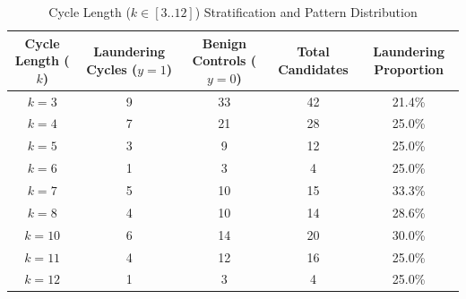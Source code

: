 \begin{table}[htbp]
\centering
\caption{Cycle Length ($k \in [3..12]$) Stratification and Pattern Distribution}
\label{tab:cycle_ablation}
\begin{tabular}{ccccc}
\hline
\textbf{Cycle Length ($k$)} & \textbf{Laundering Cycles ($y=1$)} & \textbf{Benign Controls ($y=0$)} & \textbf{Total Candidates} & \textbf{Laundering Proportion} \\
\hline
$k = 3$ & 9 & 33 & 42 & 21.4\% \\
$k = 4$ & 7 & 21 & 28 & 25.0\% \\
$k = 5$ & 3 & 9 & 12 & 25.0\% \\
$k = 6$ & 1 & 3 & 4 & 25.0\% \\
$k = 7$ & 5 & 10 & 15 & 33.3\% \\
$k = 8$ & 4 & 10 & 14 & 28.6\% \\
$k = 10$ & 6 & 14 & 20 & 30.0\% \\
$k = 11$ & 4 & 12 & 16 & 25.0\% \\
$k = 12$ & 1 & 3 & 4 & 25.0\% \\
\hline
\end{tabular}
\end{table}
